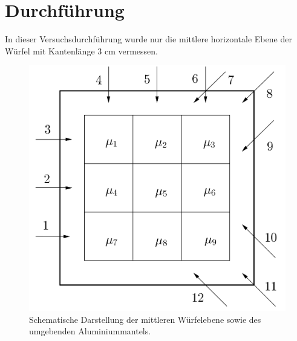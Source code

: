 

\section{Durchführung}
In dieser Versuchsdurchführung wurde nur die mittlere horizontale Ebene der Würfel mit Kantenlänge
$3$ cm vermessen.

\begin{figure}[h]
\centering
\includegraphics[scale=0.18]{../skript/domi.jpg}
\caption{Schematische Darstellung der mittleren Würfelebene sowie des umgebenden
Aluminiummantels.}
\label{fig:Wuerfel}
\end{figure}

